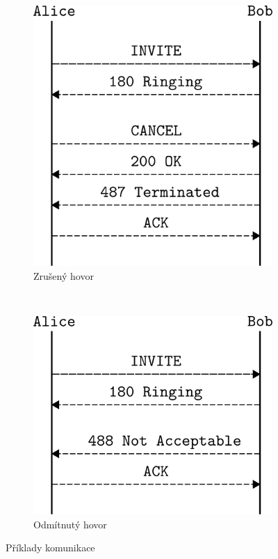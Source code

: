 \documentclass[11pt,a4paper]{article}
\begin{document}
\begin{figure}[htb]
\begin{subfigure}[t]{0.3\textwidth}
    \includegraphics[width=\textwidth]{canceled}
    \caption{Zrušený hovor}
    \label{fig:canceled}
  \end{subfigure}
    ~ %
  \begin{subfigure}[t]{0.3\textwidth}
    \centering
    \includegraphics[width=\textwidth]{refused}
    \caption{Odmítnutý hovor}
    \label{fig:refused}
  \end{subfigure}
  \caption{Příklady komunikace \cite{rfc3665}}\label{fig:example}
\end{figure}
\end{document}
